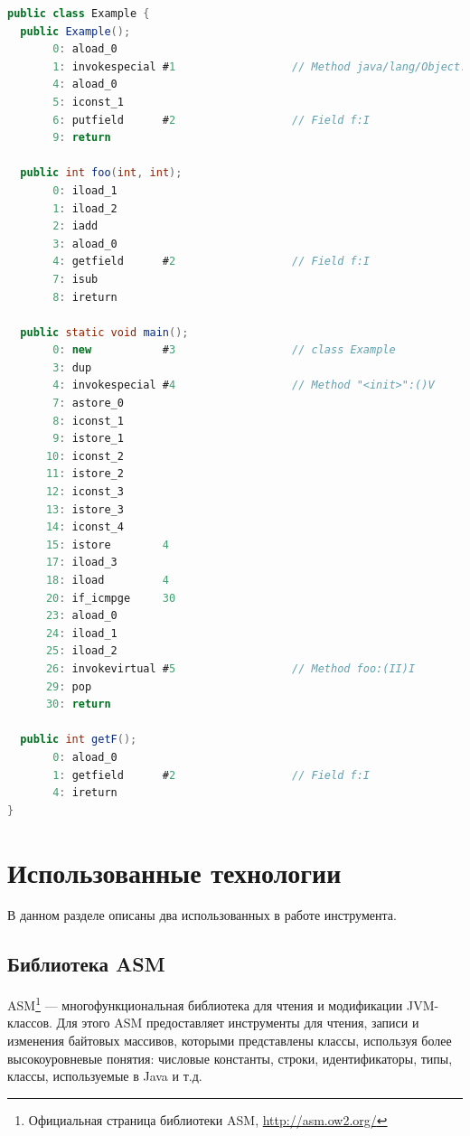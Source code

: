 \newpage
\begin{lstlisting}[label=JVM-example,caption=Представление класса в JVM, frame = single, language = Java]
public class Example {
  public Example();
       0: aload_0
       1: invokespecial #1                  // Method java/lang/Object."<init>":()V
       4: aload_0
       5: iconst_1
       6: putfield      #2                  // Field f:I
       9: return

  public int foo(int, int);
       0: iload_1
       1: iload_2
       2: iadd
       3: aload_0
       4: getfield      #2                  // Field f:I
       7: isub
       8: ireturn

  public static void main();
       0: new           #3                  // class Example
       3: dup
       4: invokespecial #4                  // Method "<init>":()V
       7: astore_0
       8: iconst_1
       9: istore_1
      10: iconst_2
      11: istore_2
      12: iconst_3
      13: istore_3
      14: iconst_4
      15: istore        4
      17: iload_3
      18: iload         4
      20: if_icmpge     30
      23: aload_0
      24: iload_1
      25: iload_2
      26: invokevirtual #5                  // Method foo:(II)I
      29: pop
      30: return

  public int getF();
       0: aload_0
       1: getfield      #2                  // Field f:I
       4: ireturn
}
\end{lstlisting}


\section{Использованные технологии}
В данном разделе описаны два использованных в работе инструмента.

\subsection{Библиотека ASM}
ASM\footnote{Официальная страница библиотеки ASM, \url{http://asm.ow2.org/}} \cite{asm_guide} --- многофункциональная библиотека для чтения и модификации JVM-классов. Для этого ASM предоставляет инструменты для чтения, записи и изменения байтовых массивов, которыми представлены классы, используя более высокоуровневые понятия: числовые константы, строки, идентификаторы, типы, классы, используемые в Java и т.д. 

